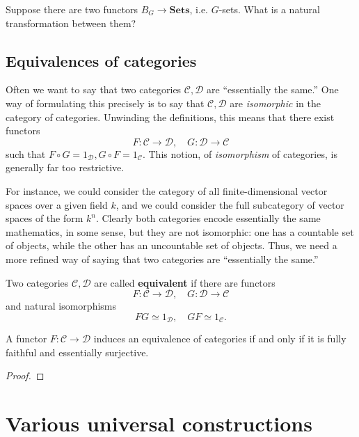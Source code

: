 \begin{exercise}
 Suppose there are  two functors $B_G \to
\mathbf{Sets}$, i.e. $G$-sets. What is a natural transformation between them?
\end{exercise}

\subsection{Equivalences of categories}

Often we want to say that two categories $\mathcal{C}, \mathcal{D}$ are ``essentially the same.'' One way
of formulating this precisely is to say that $\mathcal{C}, \mathcal{D}$ are
\emph{isomorphic} in the category of categories. Unwinding the definitions,
this means that there exist functors
\[ F: \mathcal{C} \to \mathcal{D}, \quad G: \mathcal{D} \to \mathcal{C} \]
such that $F \circ G = 1_{\mathcal{D}}, G \circ F = 1_{\mathcal{C}}$.
This notion, of \emph{isomorphism} of categories, is generally far too
restrictive.

For instance, we could consider the category of all finite-dimensional vector
spaces over a given field $k$, and we could consider the full subcategory
of vector spaces of the form $k^n$. Clearly both categories encode essentially
the same mathematics, in some sense, but they are not isomorphic: one has a
countable set of objects, while the other has an uncountable set of objects.
Thus, we need  a more refined way of saying that two categories are
``essentially the same.''

\begin{definition} 
Two categories $\mathcal{C}, \mathcal{D}$ are called \textbf{equivalent} if
there are functors
\[ F: \mathcal{C} \to \mathcal{D}, \quad G: \mathcal{D} \to \mathcal{C}  \]
and natural isomorphisms
\[ F G \simeq 1_{\mathcal{D}}, \quad GF \simeq 1_{\mathcal{C}}.  \]
\end{definition} 

\begin{proposition} 
A functor $F: \mathcal{C} \to \mathcal{D}$ induces an equivalence of categories
if and only if it is fully faithful and essentially surjective.
\end{proposition} 
\begin{proof} 
\end{proof} 

\section{Various universal constructions}

